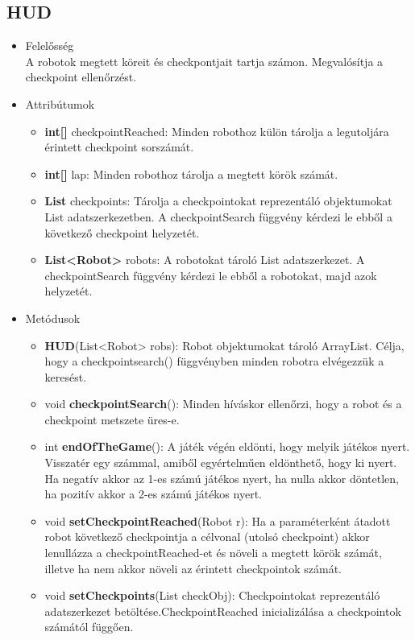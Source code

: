 \subsection{HUD}
\begin{itemize}
\item Felelősség\\
A robotok megtett köreit és checkpontjait tartja számon. Megvalósítja a checkpoint ellenőrzést.
\item Attribútumok
	\begin{itemize}
		\item \textbf{int[]} checkpointReached: Minden robothoz külön tárolja a legutoljára érintett checkpoint sorszámát.
		\item \textbf{int[]} lap: Minden robothoz tárolja a megtett körök számát. 
		\item \textbf{List} checkpoints: Tárolja a checkpointokat reprezentáló objektumokat List adatszerkezetben. A checkpointSearch függvény kérdezi le ebből a következő checkpoint helyzetét. 
		\item \textbf{List<Robot>} robots: A robotokat tároló List adatszerkezet. A checkpointSearch függvény kérdezi le ebből a robotokat, majd azok helyzetét.
	\end{itemize}
\item Metódusok
	\begin{itemize}
		\item \textbf{HUD}(List<Robot> robs): Robot objektumokat tároló ArrayList. Célja, hogy a checkpointsearch() függvényben minden robotra elvégezzük a keresést.
		\item void \textbf{checkpointSearch}(): Minden híváskor ellenőrzi, hogy a robot és a checkpoint metszete üres-e. 
		\item int \textbf{endOfTheGame}(): A játék végén eldönti, hogy melyik játékos nyert. Visszatér egy számmal, amiből egyértelműen eldönthető, hogy ki nyert. Ha negatív akkor az 1-es számú játékos nyert, ha nulla akkor döntetlen, ha pozitív akkor a 2-es számú játékos nyert.
		\item void \textbf{setCheckpointReached}(Robot r): Ha a paraméterként átadott robot következő checkpointja a célvonal (utolsó checkpoint) akkor lenullázza a checkpointReached-et és növeli a megtett körök számát, illetve ha nem akkor növeli az érintett checkpointok számát.
		\item void \textbf{setCheckpoints}(List checkObj): Checkpointokat reprezentáló adatszerkezet betöltése.CheckpointReached inicializálása a checkpointok számától függően.
	\end{itemize}
\end{itemize}

